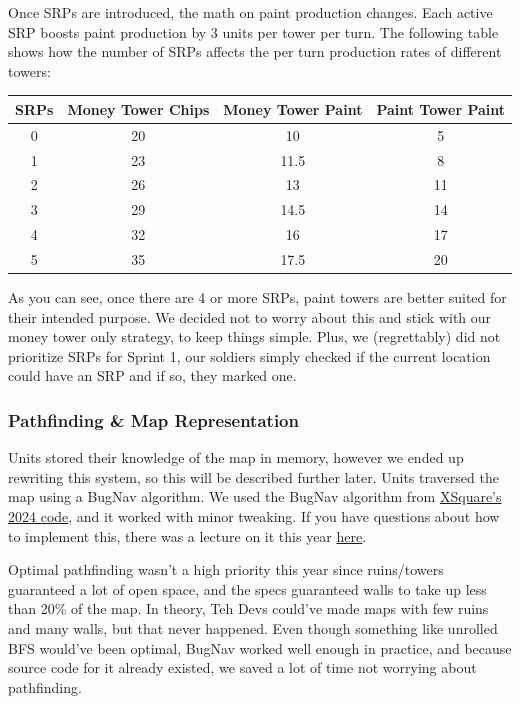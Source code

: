   Once SRPs are introduced, the math on paint production changes. Each active SRP boosts paint production by 3 units per tower per turn. The following table shows how the number of SRPs affects the per turn production rates of different towers:
  \begin{center}
    \begin{tabular}{c | c | c | c}
      SRPs & Money Tower Chips & Money Tower Paint & Paint Tower Paint \\
      \hline
      0 & 20 & 10 & 5 \\
      1 & 23 & 11.5 & 8 \\
      2 & 26 & 13 & 11 \\
      3 & 29 & 14.5 & 14 \\
      4 & 32 & 16 & 17 \\
      5 & 35 & 17.5 & 20
    \end{tabular}
  \end{center}
  As you can see, once there are 4 or more SRPs, paint towers are better suited for their intended purpose. We decided not to worry about this and stick with our money tower only strategy, to keep things simple. Plus, we (regrettably) did not prioritize SRPs for Sprint 1, our soldiers simply checked if the current location could have an SRP and if so, they marked one.

  \subsubsection{Pathfinding \& Map Representation}

  Units stored their knowledge of the map in memory, however we ended up rewriting this system, so this will be described further later. Units traversed the map using a BugNav algorithm. We used the BugNav algorithm from \href{https://github.com/IvanGeffner/BTC24/blob/master/BugPath.java}{XSquare's 2024 code}, and it worked with minor tweaking. If you have questions about how to implement this, there was a lecture on it this year \href{https://www.youtube.com/live/Mqk50BQH3oQ?si=6qL5WAXmSOS2K3OR}{here}.

  \medskip

  Optimal pathfinding wasn't a high priority this year since ruins/towers guaranteed a lot of open space, and the specs guaranteed walls to take up less than 20\% of the map. In theory, Teh Devs could've made maps with few ruins and many walls, but that never happened. Even though something like unrolled BFS would've been optimal, BugNav worked well enough in practice, and because source code for it already existed, we saved a lot of time not worrying about pathfinding.

